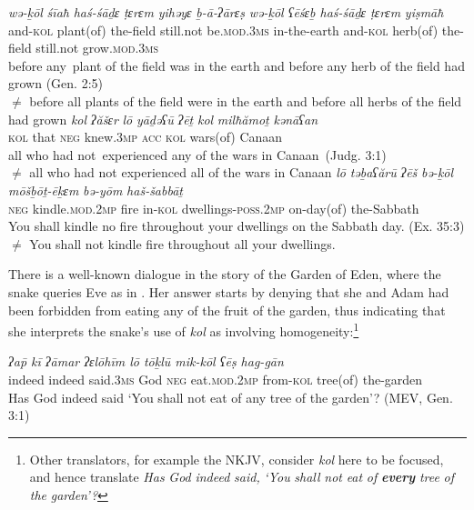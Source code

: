 \documentclass[output=paper]{langsci/langscibook}
\begin{document}
\ea%
    \label{ex:doron:29}
    \ea
    \gll \textit{wə-ḵōl}     \textit{śīaħ}         \textit{haś-śāḏɛ} \textit{ṭɛrɛm}     \textit{yihǝyɛ}           \textit{ḇ-ā-ʔārɛṣ}    \textit{wə{}-ḵōl    ʕēśɛḇ       haś-śāḏɛ ṭɛrɛm} \textit{yiṣmāħ}\\
         and-\textsc{kol} plant(of) the-field  still.not be.\textsc{mod.3ms} in-the-earth and-\textsc{kol} herb(of) the-field still.not grow.\textsc{mod.3ms}\\
    \glt before any~plant of the field was in the earth and before any herb of the field had grown (Gen. 2:5)\\ ${\neq}$  before all plants of the field were in the earth and before all herbs of the field had grown
    \ex
    \gll \textit{kol}   \textit{ʔăšɛr} \textit{lō}     \textit{yāḏəʕū}      \textit{ʔēṯ}   \textit{kol}   \textit{milħămoṯ}   \textit{kənāʕan}\\
         \textsc{kol} that   \textsc{neg} knew.\textsc{3mp}  \textsc{acc} \textsc{kol} wars(of)    Canaan\\
    \glt all who had not~experienced any of the wars in Canaan~(Judg. 3:1)\\${\neq}$  all who had not experienced all of the wars in Canaan
    \ex
    \gll \textit{lō}     \textit{təḇaʕărū}               \textit{ʔēš}  \textit{bə-ḵōl}   \textit{mōšḇōṯ-ēḵɛm}              \textit{bə-yōm}      \textit{haš-šabbāṯ}\\
         \textsc{neg} kindle.\textsc{mod.2mp}  fire  in-\textsc{kol} dwellings-\textsc{poss.2mp}  on-day(of) the-Sabbath\\
    \glt You shall kindle no fire throughout your dwellings on the Sabbath day.  (Ex. 35:3)\\${\neq}$  You shall not kindle fire throughout all your dwellings.
    \z
\z

There is a well-known dialogue in the story of the Garden of Eden, where the snake queries Eve as in . Her answer starts by denying that she and Adam had been forbidden from eating any of the fruit of the garden, thus indicating that she interprets the snake’s use of \textit{kol} as involving homogeneity:\footnote{Other translators, for example the NKJV, consider \textit{kol} here to be focused, and hence translate \textrm{\textit{Has} \textit{God} \textit{indeed} \textit{said,} \textit{‘You} \textit{shall} \textit{not} \textit{eat} \textit{of} }\textrm{\textbf{\textit{every}}}\textrm{ \textit{tree} \textit{of} \textit{the} \textit{garden’?}}}

\ea%
    \label{ex:doron:30}
    \gll \textit{ʔa\={p}        kī         ʔāmar     ʔɛlōhīm  lō     tōḵlū               mik-kōl     ʕēṣ        hag-gān}\\
         indeed  indeed  said.\textsc{3ms}  God       \textsc{neg} eat\textsc{.mod.2mp} from-\textsc{kol} tree(of) the-garden  \\
    \glt Has God indeed said ‘You shall not eat of any tree of the garden’?  (MEV, Gen. 3:1)
    \z
\end{document}
